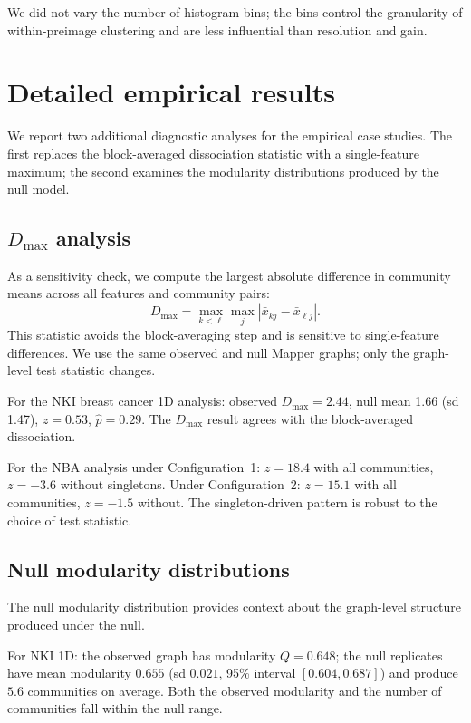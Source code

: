 \documentclass[hidelinks]{siamart251216}
\begin{document}
We did not vary the number of histogram bins; the bins control the
granularity of within-preimage clustering and are less influential than
resolution and gain.


\section{Detailed empirical results}\label{sm:empirical}

We report two additional diagnostic analyses for the empirical case
studies.  The first replaces the block-averaged dissociation statistic
with a single-feature maximum; the second examines the modularity
distributions produced by the null model.

\subsection{$D_{\max}$ analysis}

As a sensitivity check, we compute the largest absolute difference in
community means across all features and community pairs:
\[
  D_{\max} = \max_{k < \ell} \max_j
  |\bar{x}_{kj} - \bar{x}_{\ell j}|.
\]
This statistic avoids the block-averaging step and is sensitive to
single-feature differences.  We use the same observed and null Mapper
graphs; only the graph-level test statistic changes.

For the NKI breast cancer 1D analysis: observed $D_{\max} = 2.44$, null
mean 1.66 (sd 1.47), $z = 0.53$, $\hat{p} = 0.29$.  The $D_{\max}$
result agrees with the block-averaged dissociation.

For the NBA analysis under Configuration~1: $z = 18.4$ with all
communities, $z = -3.6$ without singletons.  Under Configuration~2:
$z = 15.1$ with all communities, $z = -1.5$ without.  The
singleton-driven pattern is robust to the choice of test statistic.

\subsection{Null modularity distributions}

The null modularity distribution provides context about the graph-level
structure produced under the null.

For NKI 1D: the observed graph has modularity $Q = 0.648$; the null
replicates have mean modularity $0.655$ (sd $0.021$, 95\% interval
$[0.604, 0.687]$) and produce $5.6$ communities on average.  Both the
observed modularity and the number of communities fall within the null
range.
\end{document}
